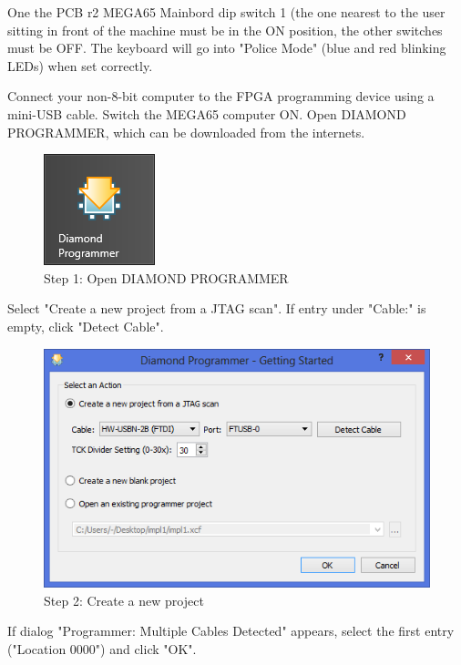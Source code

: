 One the PCB r2 MEGA65 Mainbord dip switch 1 (the one nearest to the user sitting in front of the machine
must be in the ON position, the other switches must be OFF. The keyboard will go into "Police Mode"
(blue and red blinking LEDs) when set correctly.

Connect your non-8-bit computer to the FPGA programming device using a mini-USB cable. Switch
the MEGA65 computer ON. Open DIAMOND PROGRAMMER, which can be downloaded from the internets.

\begin{figure}
  \includegraphics{images/diamond01.png}
  \caption{Step 1: Open DIAMOND PROGRAMMER}
  \label{fig:diamond01}
\end{figure}

Select "Create a new project from a JTAG scan". If entry under "Cable:" is empty, click "Detect Cable".

\begin{figure}
  \includegraphics[width=\linewidth]{images/diamond02.png}
  \caption{Step 2: Create a new project}
  \label{fig:diamond02}
\end{figure}

If dialog "Programmer: Multiple Cables Detected" appears, select the first entry ("Location 0000") and click "OK".

